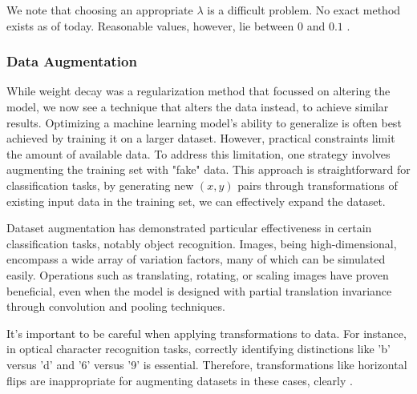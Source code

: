 \documentclass{article}
\begin{document}
We note that choosing an appropriate $\lambda$ is a difficult problem. No exact method exists as of today. Reasonable values, however, lie between $0$ and $0.1$ \citep{Kuhn_13}. 
\subsubsection{Data Augmentation}%
  \label{sub:Data Augmentation}
  While weight decay was a regularization method that focussed on altering the model, we now see a technique that alters the data instead, to achieve similar results. Optimizing a machine learning model's ability to generalize is often best achieved by training it on a larger dataset. However, practical constraints limit the amount of available data. To address this limitation, one strategy involves augmenting the training set with "fake" data. This approach is straightforward for classification tasks, by generating new $(x, y)$ pairs through transformations of existing input data in the training set, we can effectively expand the dataset.

Dataset augmentation has demonstrated particular effectiveness in certain classification tasks, notably object recognition. Images, being high-dimensional, encompass a wide array of variation factors, many of which can be simulated easily. Operations such as translating, rotating, or scaling images have proven beneficial, even when the model is designed with partial translation invariance through convolution and pooling techniques.

It's important to be careful when applying transformations to data. For instance, in optical character recognition tasks, correctly identifying distinctions like 'b' versus 'd' and '6' versus '9' is essential. Therefore, transformations like horizontal flips are inappropriate for augmenting datasets in these cases, clearly \citep{Goodfellow-et-al-2016}. 
\end{document}
